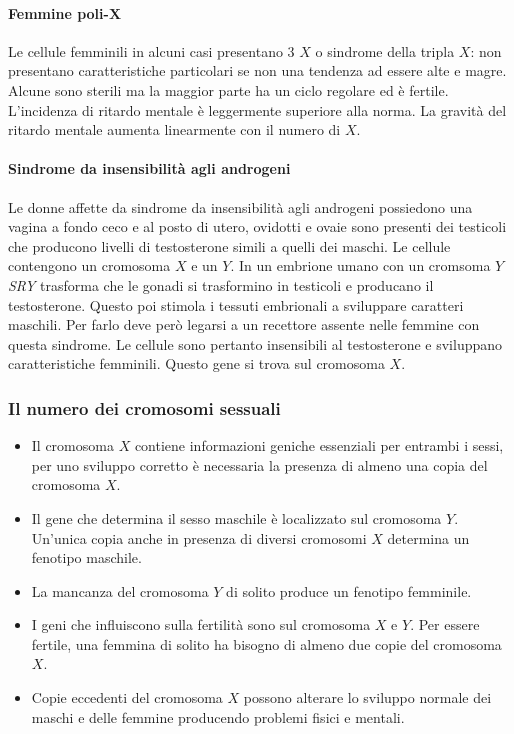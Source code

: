 			\paragraph{Femmine poli-$\mathbf{X}$}
			Le cellule femminili in alcuni casi presentano $3$ $X$ o sindrome della tripla $X$: non presentano caratteristiche particolari se non una tendenza ad essere alte e magre.
			Alcune sono sterili ma la maggior parte ha un ciclo regolare ed \`e fertile.
			L'incidenza di ritardo mentale \`e leggermente superiore alla norma.
			La gravit\`a del ritardo mentale aumenta linearmente con il numero di $X$.
	
			\paragraph{Sindrome da insensibilit\`a agli androgeni}
			Le donne affette da sindrome da insensibilit\`a agli androgeni possiedono una vagina a fondo ceco e al posto di utero, ovidotti e ovaie sono presenti dei testicoli che producono livelli di testosterone simili a quelli dei maschi.
			Le cellule contengono un cromosoma $X$ e un $Y$.
			In un embrione umano con un cromsoma $Y$ \emph{SRY} trasforma che le gonadi si trasformino in testicoli e producano il testosterone.
			Questo poi stimola i tessuti embrionali a sviluppare caratteri maschili.
			Per farlo deve per\`o legarsi a un recettore assente nelle femmine con questa sindrome.
			Le cellule sono pertanto insensibili al testosterone e sviluppano caratteristiche femminili.
			Questo gene si trova sul cromosoma $X$.
	

		\subsubsection{Il numero dei cromosomi sessuali}
		\begin{multicols}{2}
			\begin{itemize}
				\item Il cromosoma $X$ contiene informazioni geniche essenziali per entrambi i sessi, per uno sviluppo corretto \`e necessaria la presenza di almeno una copia del cromosoma $X$.
				\item Il gene che determina il sesso maschile \`e localizzato sul cromosoma $Y$.
					Un'unica copia anche in presenza di diversi cromosomi $X$ determina un fenotipo maschile.
				\item La mancanza del cromosoma $Y$ di solito produce un fenotipo femminile.
				\item I geni che influiscono sulla fertilit\`a sono sul cromosoma $X$ e $Y$.
					Per essere fertile, una femmina di solito ha bisogno di almeno due copie del cromosoma $X$.
				\item Copie eccedenti del cromosoma $X$ possono alterare lo sviluppo normale dei maschi e delle femmine producendo problemi fisici e mentali.
			\end{itemize}
		\end{multicols}
	
